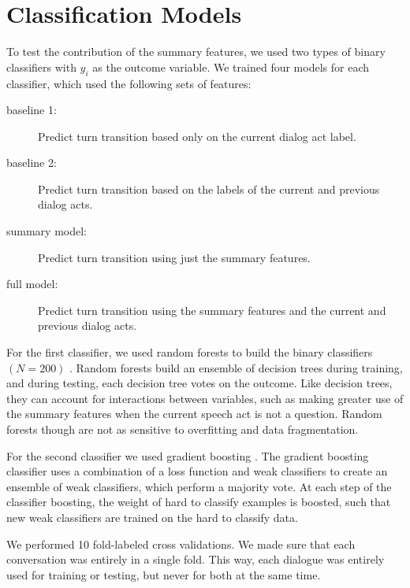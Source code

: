 \section{Classification Models}

    To test the contribution of the summary features, we used two types of binary classifiers with
    $y_i$ as the outcome variable. We trained four models for each classifier, which used the following sets of features:

    \begin{description}
        \item[baseline 1:] Predict turn transition based only on the current dialog act label.
        \item[baseline 2:] Predict turn transition based on the labels of the current and previous dialog acts.
        \item[summary model:] Predict turn transition using just the summary features.
        \item[full model:] Predict turn transition using the summary features and the current and previous dialog acts.
    \end{description}


For the first classifier, we used random forests to build the binary classifiers $(N=200)$ \cite{Breiman01randomforests}. Random forests build an ensemble of decision trees during training, and during testing, each decision tree votes on the outcome.  Like decision trees, they can account for interactions between variables, such as making greater use of the summary features when the current speech act is not a question.  Random forests though are not as sensitive to overfitting and data fragmentation.


For the second classifier we used gradient boosting \cite{friedman2001greedy}. The gradient boosting classifier uses a combination of a loss function and weak classifiers to create an ensemble of weak classifiers, which perform a majority vote. At each step of the classifier boosting, the weight of hard to classify examples is boosted, such that new weak classifiers are trained on the hard to classify data.

We performed 10 fold-labeled cross validations.  We made sure that each conversation was entirely in a single fold. This way, each dialogue was entirely used for training or testing, but never for both at the same time.

